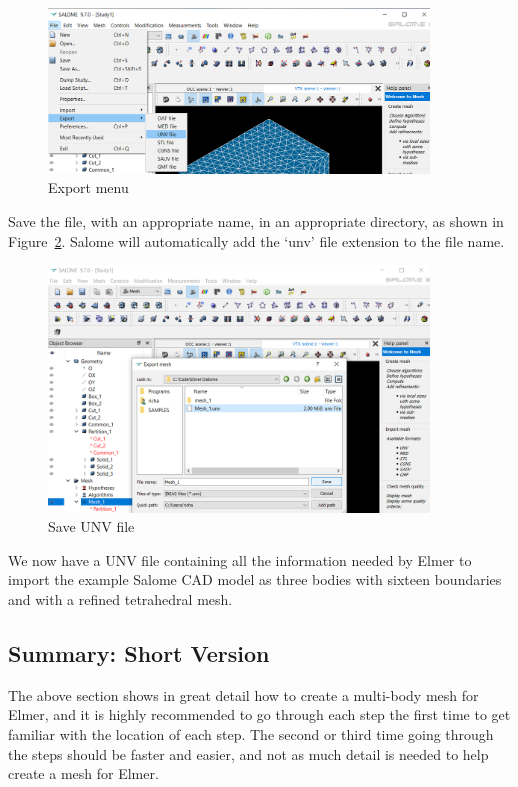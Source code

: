 \begin{figure}[H]
\centering
\includegraphics[width=0.9\textwidth]{Salome-29}
\caption{Export menu}\label{fg:salome-29}
\end{figure}

Save the file, with an appropriate name, in an appropriate directory, as shown in Figure~\ref{fg:salome-30}.  Salome will automatically add the `unv' file extension to the file name.

\begin{figure}[H]
\centering
\includegraphics[width=0.9\textwidth]{Salome-30}
\caption{Save UNV file}\label{fg:salome-30}
\end{figure}

We now have a UNV file containing all the information needed by Elmer to import the example Salome CAD model as three bodies with sixteen boundaries and with a refined tetrahedral mesh.

\subsection{Summary: Short Version}

The above section shows in great detail how to create a multi-body mesh for Elmer, and it is highly recommended to go through each step the first time to get familiar with the location of each step.  The second or third time going through the steps should be faster and easier, and not as much detail is needed to help create a mesh for Elmer.\\

